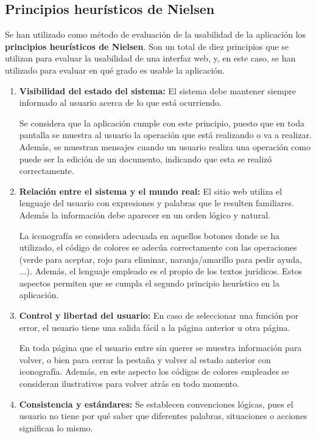 \subsection{Principios heurísticos de Nielsen}

Se han utilizado como método de evaluación de la usabilidad de la aplicación los {\bf principios heurísticos de Nielsen}. Son un total de diez principios que se utilizan para evaluar la usabilidad de una interfaz web, y, en este caso, se han utilizado para evaluar en qué grado es usable la aplicación.

\begin{enumerate}
    \item {\bf Visibilidad del estado del sistema:} El sistema debe mantener siempre informado al usuario acerca de lo que está ocurriendo.
    
    Se considera que la aplicación cumple con este principio, puesto que en toda pantalla se muestra al usuario la operación que está realizando o va a realizar. Además, se muestran mensajes cuando un usuario realiza una operación como puede ser la edición de un documento, indicando que esta se realizó correctamente.
    
    
    \item {\bf Relación entre el sistema y el mundo real:} El sitio web utiliza el lenguaje del usuario con expresiones y palabras que le resulten familiares. Además la información debe aparecer en un orden lógico y natural.
    
    La iconografía se considera adecuada en aquellos botones donde se ha utilizado, el código de colores se adecúa correctamente con las operaciones (verde para aceptar, rojo para eliminar, naranja/amarillo para pedir ayuda, ...). Además, el lenguaje empleado es el propio de los textos jurídicos. Estos aspectos permiten que se cumpla el segundo principio heurístico en la aplicación.
    
    
    \item {\bf Control y libertad del usuario:} En caso de seleccionar una función por error, el usuario tiene una salida fácil a la página anterior u otra página.
    
    En toda página que el usuario entre sin querer se muestra información para volver, o bien para cerrar la pestaña y volver al estado anterior con iconografía. Además, en este aspecto los códigos de colores empleades se consideran ilustrativos para volver atrás en todo momento.
    
    
    \item {\bf Consistencia y estándares:} Se establecen convenciones lógicas, pues el usuario no tiene por qué saber que diferentes palabras, situaciones o acciones significan lo mismo.
    

\end{enumerate}
